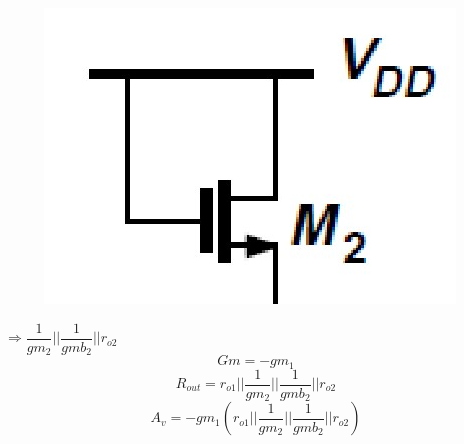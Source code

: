 \documentclass{beamer}
\begin{document}
\begin{frame}
\begin{minipage}{0.45\linewidth}
    \end{minipage}
    \begin{minipage}{0.535\linewidth}
        \begin{minipage}{0.3\linewidth}
            \begin{figure}[H]
                \includegraphics[width=\linewidth]{Rin2}
            \end{figure}
        \end{minipage}
        $\Rightarrow \dfrac{1}{gm_2}||\dfrac{1}{gmb_2}||r_{o2}$\\
        \begin{equation*}
            Gm = -gm_1
        \end{equation*}
        \begin{equation*}
            R_{out} = r_{o1}||\dfrac{1}{gm_2}||\dfrac{1}{gmb_2}||r_{o2}
        \end{equation*}
        \begin{equation*}
            A_v = -gm_1\left( r_{o1}||\dfrac{1}{gm_2}||\dfrac{1}{gmb_2}||r_{o2} \right)
        \end{equation*}
    \end{minipage}
    

\end{frame}
\end{document}
